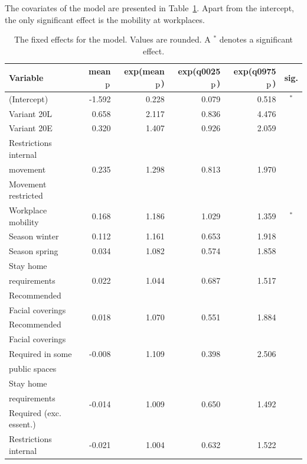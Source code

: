 The covariates of the model are presented in Table~\ref{fixed_germany_temporal}. Apart from the intercept, the only significant effect is the mobility at workplaces.
\begin{table}[H]
\caption{The fixed effects for the model. Values are rounded. A $^*$ denotes a significant effect. \label{fixed_germany_temporal}}
\begin{tabular}{l r r r r c}
\toprule
\textbf{Variable}	& \textbf{mean$_{\hbox{p}}$}	& \textbf{exp(mean$_{\hbox{p}}$)} & \textbf{exp(q0025$_{\hbox{p}}$)} & \textbf{exp(q0975$_{\hbox{p}}$)} & \textbf{sig.}\\
\midrule
(Intercept) & -1.592 & 0.228 & 0.079 & 0.518 & $^*$ \\
Variant 20L & 0.658 & 2.117 & 0.836 & 4.476 \\
Variant 20E & 0.320 & 1.407 & 0.926 & 2.059 \\
Restrictions internal & \multirow{3}{*}{0.235} & \multirow{3}{*}{1.298} & \multirow{3}{*}{0.813} & \multirow{3}{*}{1.970} \\
movement \\
Movement restricted \\
Workplace mobility & 0.168 & 1.186 & 1.029 & 1.359 & $^*$\\
Season winter & 0.112 & 1.161 & 0.653 & 1.918 \\
Season spring & 0.034 & 1.082 & 0.574 & 1.858 \\
Stay home & \multirow{3}{*}{0.022} & \multirow{3}{*}{1.044} & \multirow{3}{*}{0.687} & \multirow{3}{*}{1.517} \\
requirements \\
Recommended \\
Facial coverings & \multirow{2}{*}{0.018} & \multirow{2}{*}{1.070} & \multirow{2}{*}{0.551} & \multirow{2}{*}{1.884} \\
Recommended \\
Facial coverings & \multirow{3}{*}{-0.008} & \multirow{3}{*}{1.109} & \multirow{3}{*}{0.398} & \multirow{3}{*}{2.506} \\
Required in some \\ 
public spaces \\
Stay home & \multirow{3}{*}{-0.014} & \multirow{3}{*}{1.009} & \multirow{3}{*}{0.650} & \multirow{3}{*}{1.492}\\
requirements \\
Required (exc. essent.) \\
Restrictions internal & \multirow{3}{*}{-0.021} & \multirow{3}{*}{1.004} & \multirow{3}{*}{0.632}& \multirow{3}{*}{1.522} \\

\end{tabular}
\end{table}

